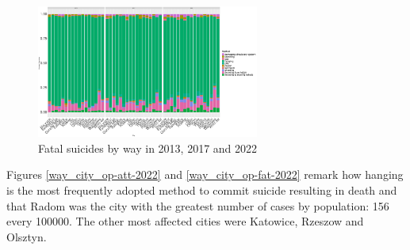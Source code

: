 \documentclass{article}
\begin{document}
\begin{figure}[H]
    \centering
    \includegraphics[width=0.65\textwidth]{imgs/way_city_fat_suicides-131722.pdf}
    \caption{Fatal suicides by way  in 2013, 2017 and 2022}
    \label{way_city_fat_suicides-131722}
\end{figure}
Figures \ref{way_city_op-att-2022} and \ref{way_city_op-fat-2022}
remark how hanging is the most frequently adopted method to commit suicide resulting
in death and that Radom was the city with the greatest number of cases by population: 156 every 100000.
The other most affected cities were Katowice, Rzeszow and Olsztyn.
\end{document}
